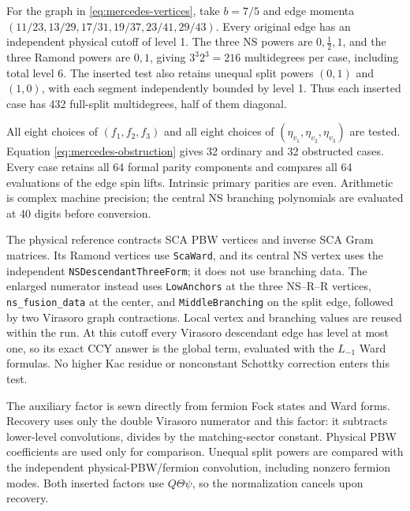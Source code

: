 \documentclass[11pt]{article}
\numberwithin{equation}{section}
\begin{document}
For the graph in \eqref{eq:mercedes-vertices}, take $b=7/5$ and edge
momenta $(11/23,13/29,17/31,19/37,23/41,29/43)$. Every original edge has
an independent physical cutoff of level 1. The three NS powers are
$0,\frac12,1$, and the three Ramond powers are $0,1$, giving
$3^3 2^3=216$ multidegrees per case, including total level 6.
The inserted test also retains unequal split powers $(0,1)$ and $(1,0)$,
with each segment independently bounded by level 1. Thus each inserted
case has 432 full-split multidegrees, half of them diagonal.

All eight choices of $(f_1,f_2,f_3)$ and all eight choices of
$(\eta_{v_1},\eta_{v_2},\eta_{v_3})$ are tested. Equation
\eqref{eq:mercedes-obstruction} gives 32 ordinary and 32 obstructed cases.
Every case retains all 64 formal parity components and compares all 64
evaluations of the edge spin lifts. Intrinsic primary parities are even.
Arithmetic is complex machine precision; the central NS branching
polynomials are evaluated at 40 digits before conversion.

The physical reference contracts SCA PBW vertices and inverse SCA Gram
matrices. Its Ramond vertices use \texttt{ScaWard}, and its central NS
vertex uses the independent \texttt{NSDescendantThreeForm}; it does not
use branching data. The enlarged numerator instead uses
\texttt{LowAnchors} at the three NS--R--R vertices,
\texttt{ns\_fusion\_data} at the center, and \texttt{MiddleBranching} on
the split edge, followed by two Virasoro graph contractions. Local vertex
and branching values are reused within the run. At this cutoff every
Virasoro descendant edge has level at most one, so its exact CCY answer
is the global term, evaluated with the $L_{-1}$ Ward formulas.
No higher Kac residue or nonconstant Schottky correction enters this test.

The auxiliary factor is sewn directly from fermion Fock states and Ward
forms. Recovery uses only the double Virasoro numerator and this factor:
it subtracts lower-level convolutions, divides by the matching-sector
constant. Physical PBW coefficients
are used only for comparison. Unequal split powers are compared with the
independent physical-PBW/fermion convolution, including nonzero fermion
modes. Both inserted factors use $Q\Theta\psi$, so the normalization
cancels upon recovery.
\end{document}
